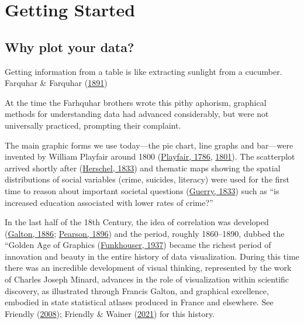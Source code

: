 \documentclass[
  letterpaper,
  10pt,
  krantz2]{krantz}
\renewenvironment{quote}{\begin{VF}}{\end{VF}}
\newcommand{\ix}[1]{\index{#1}}
\begin{document}

\hypertarget{sec-getting_started}{%
\chapter{Getting Started}\label{sec-getting_started}}

\hypertarget{sec-why_plot}{%
\section{Why plot your data?}\label{sec-why_plot}}

\begin{quote}
Getting information from a table is like extracting sunlight from a
cucumber. Farquhar \& Farquhar
(\protect\hyperlink{ref-FarquharFarquhar:91}{1891})
\end{quote}

At the time the Farhquhar brothers wrote this pithy aphorism, graphical
methods for understanding data had advanced considerably, but were not
universally practiced, prompting their complaint.

The main graphic forms we use today---the pie chart, line graphs and
bar---were invented by William Playfair around 1800
(\protect\hyperlink{ref-Playfair:1786}{Playfair, 1786},
\protect\hyperlink{ref-Playfair:1801}{1801}). The scatterplot arrived
shortly after (\protect\hyperlink{ref-Herschel:1833}{Herschel, 1833})
and thematic maps showing the spatial distributions of social variables
(crime, suicides, literacy) were used for the first time to reason about
important societal questions
(\protect\hyperlink{ref-Guerry:1833}{Guerry, 1833}) such as ``is
increased education associated with lower rates of crime?''
\ix{pie chart} \ix{bar chart} \ix{line graph} \ix{scatterplot}

In the last half of the 18th Century, the idea of correlation was
developed (\protect\hyperlink{ref-Galton:1886}{Galton, 1886};
\protect\hyperlink{ref-Pearson:1896}{Pearson, 1896}) and the period,
roughly 1860--1890, dubbed the ``Golden Age of Graphics
(\protect\hyperlink{ref-Funkhouser:1937}{Funkhouser, 1937}) became the
richest period of innovation and beauty in the entire history of data
visualization. During this time there was an incredible development of
visual thinking, represented by the work of Charles Joseph Minard,
advances in the role of visualization within scientific discovery, as
illustrated through Francis Galton, and graphical excellence, embodied
in state statistical atlases produced in France and elsewhere. See
Friendly (\protect\hyperlink{ref-Friendly:2008:golden}{2008}); Friendly
\& Wainer (\protect\hyperlink{ref-FriendlyWainer:2021:TOGS}{2021}) for
this history.
\end{document}

